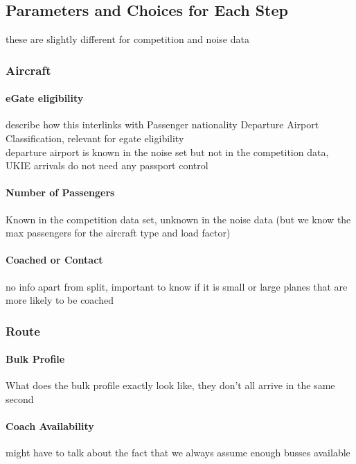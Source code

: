 \documentclass[10pt]{article}
\begin{document}
\subsection{Parameters and Choices for Each Step}
these are slightly different for competition and noise data

\subsubsection{Aircraft}

\paragraph{eGate eligibility}
describe how this interlinks with Passenger nationality Departure Airport Classification, relevant for egate eligibility \\
 departure airport is known in the noise set but not in the competition data, UKIE arrivals do not need any passport control

\paragraph{Number of Passengers}
Known in the competition data set, unknown in the noise data (but we know the max passengers for the aircraft type and load factor)

\paragraph{Coached or Contact}
no info apart from split, important to know if it is small or large planes that are more likely to be coached

\subsubsection{Route}

\paragraph{Bulk Profile} 
What does the bulk profile exactly look like, they don't all arrive in the same second 

\paragraph{Coach Availability}
might have to talk about the fact that we always assume enough busses available
\end{document}
